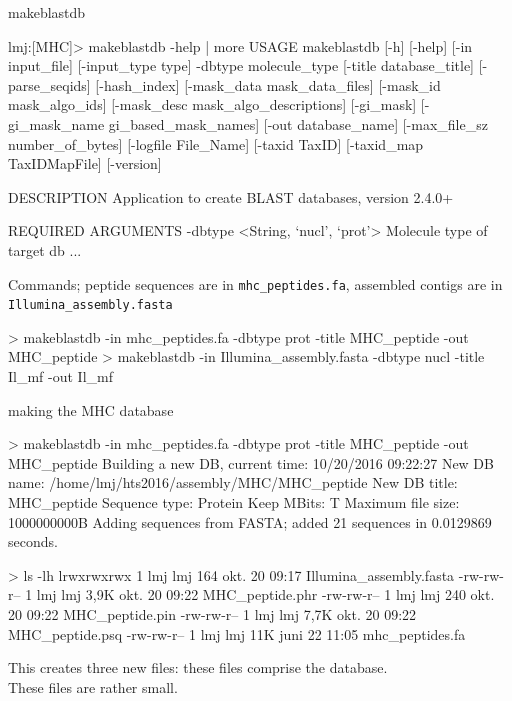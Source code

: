 \documentclass[pdf]{beamer}
\begin{document}
\begin{frame}[fragile]{makeblastdb}
    \begin{consolecode}
      lmj:[MHC]> makeblastdb -help | more
      USAGE                                                                                                                                                                 
      makeblastdb [-h] [-help] [-in input_file] [-input_type type]                                                                                                        
      -dbtype molecule_type [-title database_title] [-parse_seqids]                                                                                                     
      [-hash_index] [-mask_data mask_data_files] [-mask_id mask_algo_ids]                                                                                               
      [-mask_desc mask_algo_descriptions] [-gi_mask]
      [-gi_mask_name gi_based_mask_names] [-out database_name]
      [-max_file_sz number_of_bytes] [-logfile File_Name] [-taxid TaxID]
      [-taxid_map TaxIDMapFile] [-version]
      
      DESCRIPTION
      Application to create BLAST databases, version 2.4.0+
      
      REQUIRED ARGUMENTS
      -dbtype <String, `nucl', `prot'>
      Molecule type of target db
      ...
    \end{consolecode}

    \footnotesize{
      Commands; peptide sequences are in \verb|mhc_peptides.fa|,
      assembled contigs are in \verb|Illumina_assembly.fasta|
    }
    \begin{consolecode}
      > makeblastdb -in mhc_peptides.fa -dbtype prot -title MHC_peptide -out MHC_peptide
      > makeblastdb -in Illumina_assembly.fasta -dbtype nucl -title Il_mf -out Il_mf
    \end{consolecode}
     
\end{frame}

\begin{frame}[fragile]{making the MHC database}
    \begin{consolecode}
      > makeblastdb -in mhc_peptides.fa -dbtype prot -title MHC_peptide -out MHC_peptide
      Building a new DB, current time: 10/20/2016 09:22:27
      New DB name:   /home/lmj/hts2016/assembly/MHC/MHC_peptide
      New DB title:  MHC_peptide
      Sequence type: Protein
      Keep MBits: T
      Maximum file size: 1000000000B
      Adding sequences from FASTA; added 21 sequences in 0.0129869 seconds.

      > ls -lh
      lrwxrwxrwx 1 lmj lmj  164 okt.  20 09:17 Illumina_assembly.fasta
      -rw-rw-r-- 1 lmj lmj 3,9K okt.  20 09:22 MHC_peptide.phr
      -rw-rw-r-- 1 lmj lmj  240 okt.  20 09:22 MHC_peptide.pin
      -rw-rw-r-- 1 lmj lmj 7,7K okt.  20 09:22 MHC_peptide.psq
      -rw-rw-r-- 1 lmj lmj  11K juni  22 11:05 mhc_peptides.fa
    \end{consolecode}
    
    \footnotesize{
      This creates three new files: these files comprise the database.\\
      These files are rather small.
    }
\end{frame}
\end{document}
